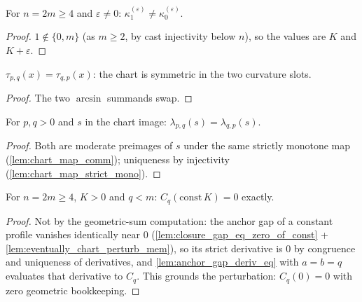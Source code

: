 \begin{lemma}
  \label{lem:two_level_profile_ne_of_ne}
  For $n = 2m \ge 4$ and $\varepsilon \ne 0$:
  $\kappa^{(\varepsilon)}_1 \ne \kappa^{(\varepsilon)}_0$.
\end{lemma}
\begin{proof}

\leanok
  $1 \notin \{0, m\}$ (as $m \ge 2$, by cast injectivity below $n$), so the
  values are $K$ and $K + \varepsilon$.
\end{proof}

\begin{lemma}
  \label{lem:chart_map_comm}
  $\tau_{p,q}(x) = \tau_{q,p}(x)$: the chart is symmetric in the two
  curvature slots.
\end{lemma}
\begin{proof}

\leanok
  The two $\arcsin$ summands swap.
\end{proof}

\begin{lemma}
  \label{lem:chart_inv_comm}
  For $p, q > 0$ and $s$ in the chart image:
  $\lambda_{p,q}(s) = \lambda_{q,p}(s)$.
\end{lemma}
\begin{proof}

\leanok
  Both are moderate preimages of $s$ under the same strictly monotone map
  (\cref{lem:chart_map_comm}); uniqueness by injectivity
  (\cref{lem:chart_map_strict_mono}).
\end{proof}

\begin{lemma}
  \label{lem:closing_jacobian_col_const_eq_zero}
  For $n = 2m \ge 4$, $K > 0$ and $q < m$:
  $C_q(\mathrm{const}\,K) = 0$ exactly.
\end{lemma}
\begin{proof}

\leanok
  Not by the geometric-sum computation: the anchor gap of a constant profile
  vanishes identically near $0$ (\cref{lem:closure_gap_eq_zero_of_const} +
  \cref{lem:eventually_chart_perturb_mem}), so its strict derivative is $0$
  by congruence and uniqueness of derivatives, and
  \cref{lem:anchor_gap_deriv_eq} with $a = b = q$ evaluates that derivative
  to $C_q$. This grounds the perturbation: $C_q(0) = 0$ with zero geometric
  bookkeeping.
\end{proof}


